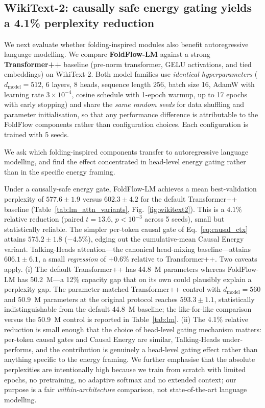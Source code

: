 \documentclass[fleqn,10pt]{article}
\begin{document}
\subsection*{WikiText-2: causally safe energy gating yields a 4.1\% perplexity reduction}

We next evaluate whether folding-inspired modules also benefit
autoregressive language modelling. We compare \textbf{FoldFlow-LM}
against a strong \textbf{Transformer++} baseline (pre-norm
transformer,\cite{ba2016layer} GELU activations, and tied embeddings)
on WikiText-2.\cite{merity2017pointer} Both model families use
\emph{identical hyperparameters} ($d_\text{model}{=}512$, 6 layers,
8 heads, sequence length 256, batch size 16, AdamW with learning rate
$3\times 10^{-4}$, cosine schedule with 1-epoch warmup,\cite{loshchilov2017decoupled}
up to 17 epochs with early stopping) and share the \emph{same
random seeds} for data shuffling and parameter initialisation, so
that any performance difference is attributable to the FoldFlow
components rather than configuration choices. Each configuration is
trained with 5 seeds.

We ask which folding-inspired components transfer to autoregressive
language modelling, and find the effect concentrated in head-level
energy gating rather than in the specific energy framing.

Under a causally-safe energy gate, FoldFlow-LM achieves a mean
best-validation perplexity of $\mathbf{577.6 \pm 1.9}$ versus
$602.3 \pm 4.2$ for the default Transformer++ baseline
(Table~\ref{tab:lm_attn_variants}, Fig.~\ref{fig:wikitext2}). This
is a $\mathbf{4.1\%}$ relative reduction
(paired $t = 13.6$, $p < 10^{-3}$ across 5 seeds), small but
statistically reliable. The simpler per-token causal gate of
Eq.~\ref{eq:causal_ctx} attains $575.2 \pm 1.8$ ($-4.5\%$), edging
out the cumulative-mean Causal Energy variant. Talking-Heads
attention\cite{shazeer2020talkingheads}---the canonical head-mixing
baseline---attains $606.1 \pm 6.1$,
a small \emph{regression} of $+0.6\%$ relative to Transformer++.
Two caveats apply. (i) The default Transformer++ has 44.8~M
parameters whereas FoldFlow-LM has 50.2~M---a 12\% capacity gap
that on its own could plausibly explain a perplexity gap. The
parameter-matched Transformer++ control with $d_\text{model}{=}560$
and $50.9$~M parameters at the original protocol reaches
$593.3 \pm 1.1$, statistically indistinguishable from the default
44.8~M baseline; the like-for-like comparison versus the 50.9~M
control is reported in Table~\ref{tab:lm}. (ii) The 4.1\% relative
reduction is small enough that the choice of head-level gating
mechanism matters: per-token causal gates and Causal Energy are
similar, Talking-Heads under-performs, and the contribution is
genuinely a head-level gating effect rather than anything specific
to the energy framing. We further emphasise that the absolute
perplexities are intentionally high because we train from scratch
with limited epochs, no pretraining, no adaptive softmax and no
extended context\cite{dai2019transformer}; our purpose is a fair
\emph{within-architecture} comparison, not state-of-the-art
language modelling.
\end{document}
